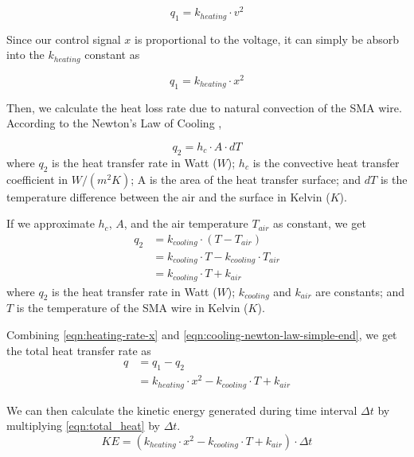 \begin{equation}\label{eqn:heating-rate-v}
q_1 = k_{heating} \cdot v^2
\end{equation}

Since our control signal $x$ is proportional to the voltage, it can simply be absorb into the $k_{heating}$ constant as 

\begin{equation}\label{eqn:heating-rate-x}
q_1 = k_{heating} \cdot x^2
\end{equation}

Then, we calculate the heat loss rate due to natural convection of the SMA wire. According to the Newton's Law of Cooling \cite{NewtonLawOfCooling}, 

\begin{equation}\label{eqn:cooling-newton-law}
q_2 = h_c \cdot A \cdot dT
\end{equation}
where $q_2$ is the heat transfer rate in Watt ($W$); $h_c$ is the convective heat transfer coefficient in $W/(m^2K)$; A is the area of the heat transfer surface; and $dT$ is the temperature difference between the air and the surface in Kelvin ($K$).

If we approximate $h_c$, $A$, and the air temperature $T_{air}$ as constant, we get
\begin{subequations}\label{eqn:cooling-newton-law-simple}
	\begin{flalign}
		q_2 &= k_{cooling} \cdot (T - T_{air}) \\
			&= k_{cooling} \cdot T - k_{cooling} \cdot T_{air} \\
			&= k_{cooling} \cdot T + k_{air}\label{eqn:cooling-newton-law-simple-end}
	\end{flalign}
\end{subequations}
where $q_2$ is the heat transfer rate in Watt ($W$); $k_{cooling}$ and $k_{air}$ are constants; and $T$ is the temperature of the SMA wire in Kelvin ($K$).

Combining \eqref{eqn:heating-rate-x} and \eqref{eqn:cooling-newton-law-simple-end}, we get the total heat transfer rate as 
\begin{subequations}
	\begin{flalign}
		q &= q_1 - q_2 \\
		  &= k_{heating} \cdot x^2 - k_{cooling} \cdot T + k_{air}\label{eqn:total_heat}
	\end{flalign}
\end{subequations}

We can then calculate the kinetic energy generated  during time interval $\Delta t$ by multiplying \eqref{eqn:total_heat} by $\Delta t$.
\begin{equation}
	KE =  (k_{heating} \cdot x^2 - k_{cooling} \cdot T + k_{air}) \cdot \Delta t \label{eqn:total_KE}
\end{equation}

